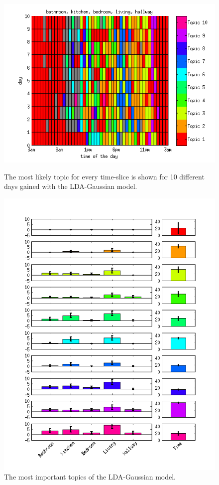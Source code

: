 \documentclass[11pt,a4paper]{article}
\begin{document}
\begin{figure}[h]
 \centering
 \begin{minipage}{0.45\linewidth}
 \centering
 \includegraphics[width=\textwidth]{Pictures/TopDayGaus.png}
 \caption{The most likely topic for every time-slice is shown for 10 different days gained with the LDA-Gaussian model.}
 \label{fig:TopicVisu}
 \end{minipage}
 \begin{minipage}{0.45\linewidth}
 \centering
 \includegraphics[width=\textwidth]{Pictures/TopBarGaus.png}
 \caption{The most important topics of the LDA-Gaussian model.}
 \label{fig:TopBarGaus}
 \end{minipage}
\end{figure}
\end{document}
